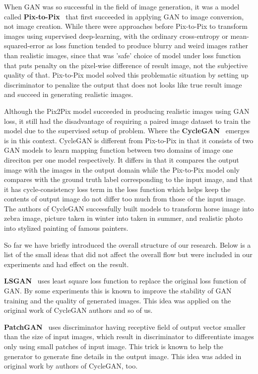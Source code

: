 When GAN was so successful in the field of image generation, it was a model called \textbf{Pix-to-Pix}~\cite{pix2pix} that first succeeded in applying GAN to image conversion, not image creation. While there were approaches before Pix-to-Pix to transform images using supervised deep-learning, with the ordinary cross-entropy or mean-squared-error as loss function tended to produce blurry and weird images rather than realistic images, since that was 'safe' choice of model under loss function that puts penalty on the pixel-wise difference of result image, not the subjective quality of that. Pix-to-Pix model solved this problematic situation by setting up discriminator to penalize the output that does not looks like true result image and succeed in generating realistic images.

Although the Pix2Pix model succeeded in producing realistic images using GAN loss, it still had the disadvantage of requiring a paired image dataset to train the model due to the supervised setup of problem. Where the \textbf{CycleGAN}~\cite{CycleGAN} emerges is in this context. CycleGAN is different from Pix-to-Pix in that it consists of two GAN models to learn mapping function between two domains of image one direciton per one model respectively. It differs in that it compares the output image with the images in the output domain while the Pix-to-Pix model only compares with the ground truth label corresponding to the input image, and that it has cycle-consistency loss term in the loss function which helps keep the contents of output image do not differ too much from those of the input image. The authors of CycleGAN successfully built models to transform horse image into zebra image, picture taken in winter into taken in summer, and realistic photo into stylized painting of famous painters.

So far we have briefly introduced the overall structure of our research. Below is a list of the small ideas that did not affect the overall flow but were included in our experiments and had effect on the result.

\textbf{LSGAN}~\cite{LSGAN} uses least square loss function to replace the original loss function of GAN. By some experiments this is known to improve the stability of GAN training and the quality of generated images. This idea was applied on the original work of CycleGAN authors and so of us.

\textbf{PatchGAN}~\cite{improved_tech_GANs} uses discriminator having receptive field of output vector smaller than the size of input images, which result in discriminator to differentiate images only using small patches of input image. This trick is known to help the generator to generate fine details in the output image. This idea was added in original work by authors of CycleGAN, too.

